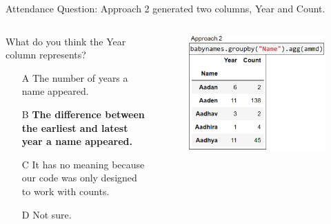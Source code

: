 \documentclass[aspectratio=169]{../latex_main/tntbeamer}  %
\begin{document}
    
    
    
     \begin{frame}{Attendance Question: }
        Approach 2 generated two columns, Year and Count.
        
        \begin{columns}
            \begin{column}{.4\textwidth}
                    What do you think the Year column represents?
                    \begin{itemize}
                        \item[A]  The number of years a name appeared.
                        \item[B] \textbf{The difference between the earliest and latest year a name appeared.}
                        \item[C] It has no meaning because our code was only designed to work with counts.
                        \item[D] Not sure.
                    \end{itemize}
            \end{column}
            
            \begin{column}{.5\textwidth}
                    \begin{figure}
                        \includegraphics[scale=.37]{Bild23}
                    \end{figure}
            \end{column}
            
        \end{columns}
        
    \end{frame}
    
\end{document}

